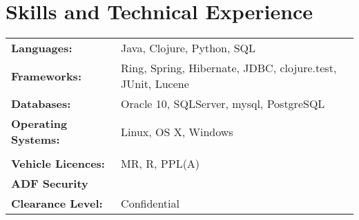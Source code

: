 \documentclass[a4paper]{article}
\begin{document}
\section*{Skills and Technical Experience}
\begin{tabular}{l l}
\textbf{Languages:} & Java, Clojure, Python, SQL\\
\textbf{Frameworks:} & Ring, Spring, Hibernate, JDBC, clojure.test, JUnit, Lucene\\
\textbf{Databases:} & Oracle 10, SQLServer, mysql, PostgreSQL\\
\textbf{Operating Systems:} & Linux, OS X, Windows\\\\
\textbf{Vehicle Licences:}&MR, R, PPL(A)\\
\textbf{ADF Security}&\\\textbf{Clearance Level:}&Confidential\\
\end{tabular}
\vspace{5pt}
\end{document}
